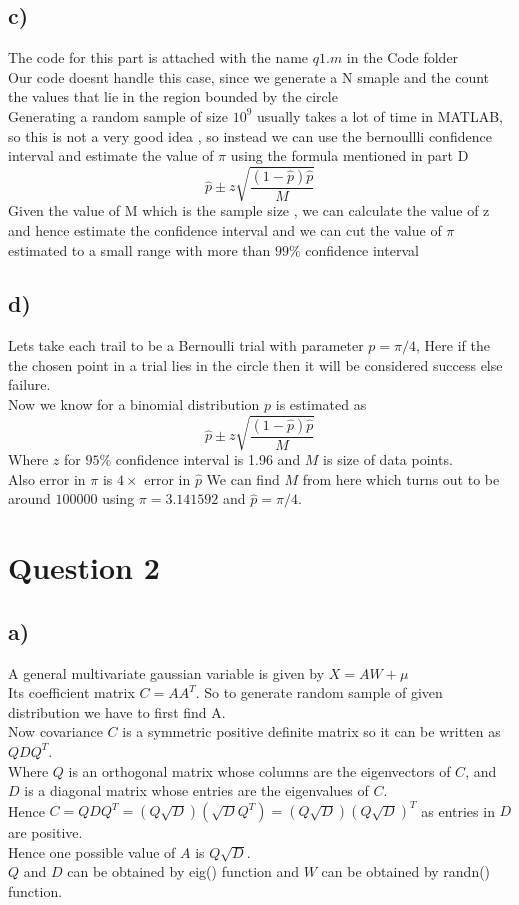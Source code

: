 \documentclass{article}
\begin{document}
\subsection*{c)}
The code for this part is attached with the name $q1.m$ in the Code folder\\
Our code doesnt handle this case, since we generate a N smaple and the count the values that lie in the region bounded by the circle\\
Generating a random sample of size $10^9$ usually takes a lot of time in MATLAB, so this is not a very good idea , so instead we can use the bernoullli confidence interval and estimate the value of $\pi$ using the formula mentioned in part D
\begin{equation}
    \hat{p} \pm z\sqrt{\frac{(1-\hat{p})\hat{p}}{M}}
\end{equation}
Given the value of M which is the sample size , we can calculate the value of z and hence estimate the confidence interval and we can cut the value of $\pi$ estimated to a small range with more than $99\%$ confidence interval\\
\subsection*{d)}
Lets take each trail to be a Bernoulli trial with parameter $p = \pi/4$, Here if the the chosen point in a trial lies in the circle then it will be considered success else failure.\\
Now we know for a binomial distribution $p$ is estimated as 
\begin{equation}
    \hat{p} \pm z\sqrt{\frac{(1-\hat{p})\hat{p}}{M}}
\end{equation}
Where $z$ for $95\%$ confidence interval is 1.96 and $M$ is size of data points.\\
Also error in $\pi$ is $4\times$ error in $\hat{p}$
We can find $M$ from here which turns out to be around $100000$ using $\pi = 3.141592$ and $\hat{p}=\pi/4$.
\section*{Question 2}
\subsection*{a)}
A general multivariate gaussian variable is given by $X = AW + \mu$ \\
Its coefficient matrix $C = A A^T$. So to generate random sample of given distribution we have to first find A.\\
Now covariance $C$ is a symmetric positive definite matrix so it can be written as $QDQ^T$.\\ Where $Q$ is an orthogonal matrix whose columns are the eigenvectors of $C$, and $D$ is a diagonal matrix whose entries are the eigenvalues of $C$.\\
Hence $C = QDQ^T = (Q\sqrt{D})(\sqrt{D}Q^T) = (Q\sqrt{D})(Q\sqrt{D})^T$ as entries in $D$ are positive.\\
Hence one possible value of $A$ is $Q\sqrt{D}$.\\
$Q$ and $D$ can be obtained by eig() function and $W$ can be obtained by randn() function. 
\end{document}
